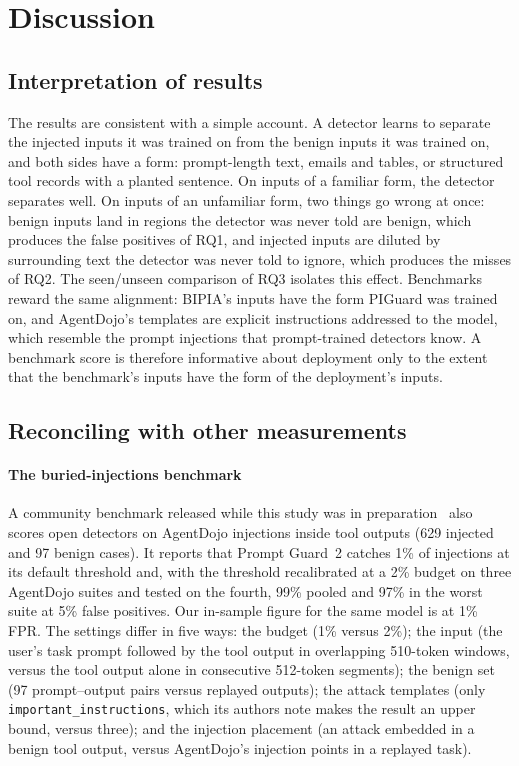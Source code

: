 \section{Discussion}
\label{sec:discussion}

\subsection{Interpretation of results}
The results are consistent with a simple account. A detector learns to separate the injected inputs it was trained on from the benign inputs it was trained on, and both sides have a form: prompt-length text, emails and tables, or structured tool records with a planted sentence. On inputs of a familiar form, the detector separates well. On inputs of an unfamiliar form, two things go wrong at once: benign inputs land in regions the detector was never told are benign, which produces the false positives of RQ1, and injected inputs are diluted by surrounding text the detector was never told to ignore, which produces the misses of RQ2. The seen/unseen comparison of RQ3 isolates this effect. Benchmarks reward the same alignment: BIPIA's inputs have the form PIGuard was trained on, and AgentDojo's templates are explicit instructions addressed to the model, which resemble the prompt injections that prompt-trained detectors know. A benchmark score is therefore informative about deployment only to the extent that the benchmark's inputs have the form of the deployment's inputs.

\subsection{Reconciling with other measurements}
\label{sec:community}

\paragraph{The buried-injections benchmark}
A community benchmark released while this study was in preparation~\cite{buriedinjections} also scores open detectors on AgentDojo injections inside tool outputs (629 injected and 97 benign cases). It reports that Prompt Guard~2 catches 1\% of injections at its default threshold and, with the threshold recalibrated at a 2\% budget on three AgentDojo suites and tested on the fourth, 99\% pooled and 97\% in the worst suite at 5\% false positives. Our in-sample figure for the same model is \MPGtAD at 1\% FPR. The settings differ in five ways: the budget (1\% versus 2\%); the input (the user's task prompt followed by the tool output in overlapping 510-token windows, versus the tool output alone in consecutive 512-token segments); the benign set (97 prompt--output pairs versus \NCleanOutputs replayed outputs); the attack templates (only \texttt{important\_instructions}, which its authors note makes the result an upper bound, versus three); and the injection placement (an attack embedded in a benign tool output, versus AgentDojo's injection points in a replayed task).

